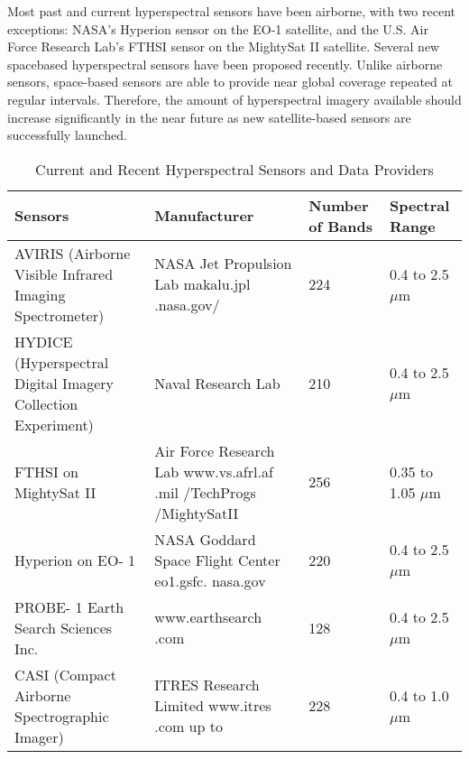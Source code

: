 \documentclass[document.tex]{subfiles}
\begin{document}
\noindent Most past and current hyperspectral sensors have been airborne, with two
recent exceptions: NASA’s Hyperion sensor on the EO-1 satellite, and the U.S. Air
Force Research Lab’s FTHSI sensor on the MightySat II satellite. Several new spacebased
hyperspectral sensors have been proposed recently. Unlike airborne
sensors, space-based sensors are able to provide near global coverage repeated at regular
intervals. Therefore, the amount of hyperspectral imagery available should increase
significantly in the near future as new satellite-based sensors are successfully launched.
\begin{table}[H]
	\caption{Current and Recent Hyperspectral Sensors and Data Providers}
	\begin{center}
		\begin{tabularx}{\columnwidth}{|X|X|X|X|}
			\hline
			Sensors & Manufacturer & Number of
			Bands &
			Spectral Range\\ \hline
			
			AVIRIS
			(Airborne
			Visible
			Infrared
			Imaging
			Spectrometer) &
			NASA Jet
			Propulsion Lab
			makalu.jpl .nasa.gov/ &
			224 & 0.4 to 2.5 $\mu$m\\ \hline
			
			HYDICE
			(Hyperspectral
			Digital
			Imagery
			Collection
			Experiment) &
			Naval Research Lab & 210 & 0.4 to 2.5 $\mu$m \\ \hline
			
			FTHSI on
			MightySat
			II &
			Air Force Research
			Lab www.vs.afrl.af .mil
			/TechProgs /MightySatII &
			256  & 0.35 to 1.05 $\mu$m \\ \hline
			Hyperion
			on EO- 1 &
			NASA Goddard
			Space Flight Center
			eo1.gsfc. nasa.gov &
			220 & 0.4 to 2.5 $\mu$m\\ \hline
			
			PROBE-
			1 Earth
			Search
			Sciences
			Inc. &
			www.earthsearch .com & 128 & 0.4 to 2.5 $\mu$m\\ \hline
			
			CASI (Compact
			Airborne
			Spectrographic
			Imager) &
			ITRES Research Limited
			www.itres .com
			up to  & 228 & 0.4 to 1.0$\mu$m\\ \hline
		\end{tabularx}
	\end{center}
	\label{tab:Current and Recent Hyperspectral Sensors and Data Providers}
\end{table}
\clearpage
\end{document}
